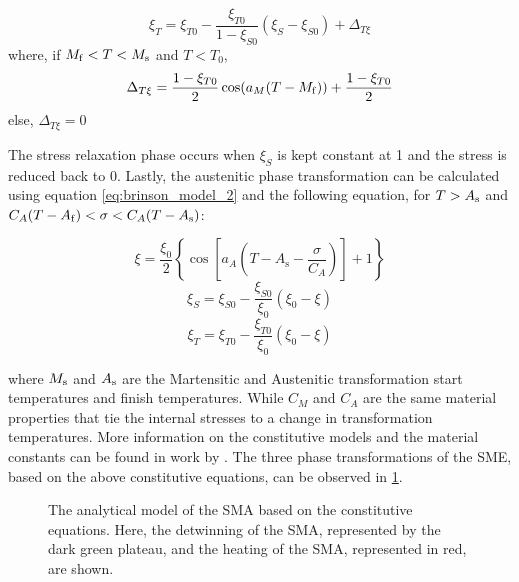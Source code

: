 \begin{equation}
  \label{eq:brinson_conv_xit2}
  \xi_T = \xi_{T0} - \frac{\xi_{T0}}{1-\xi_{S0}}(\xi_S-\xi_{S0})+\Delta_{T\xi}
\end{equation}
where, if $M_\mathrm{f}<T<M_\mathrm{s}$ and $T<T_0$,
\begin{equation}
  \label{eq:deltaTxi}
  \Delta_{T\xi} = \frac{1-\xi_{T0}}{2}\cos(a_M(T-M_\mathrm{f}))+\frac{1-\xi_{T0}}{2}
\end{equation}
else, $\Delta_{T\xi}=0$

The stress relaxation phase occurs when $\xi_S$ is kept constant at 1 and the stress is reduced back to 0. Lastly, the austenitic phase transformation can be calculated using equation \ref{eq:brinson_model_2} and the following equation, for $T>A_\mathrm{s}$ and $C_A(T-A_\mathrm{f})<\sigma<C_A(T-A_\mathrm{s})$:

\begin{equation}
  \label{eq:A_transf}
  \xi = \frac{\xi_0}{2}\left\{\cos\left[a_A\left(T-A_\mathrm{s}-\frac{\sigma}{C_A}\right)\right]+1\right\}
\end{equation}
\begin{equation}
    \label{eq:a-transf_1}
    \xi_S = \xi_{S0} - \frac{\xi_{S0}}{\xi_0}(\xi_0-\xi)
\end{equation}
\begin{equation}
    \label{eq:a-transf_2}
    \xi_T = \xi_{T0} - \frac{\xi_{T0}}{\xi_0}(\xi_0-\xi)
\end{equation}

where $M_\mathrm{s}$ and $A_\mathrm{s}$ are the Martensitic and Austenitic transformation start temperatures and finish temperatures. While $C_M$ and $C_A$ are the same material properties that tie the internal stresses to a change in transformation temperatures. More information on the constitutive models and the material constants can be found in work by \cite{brinsonOneDimensionalConstitutiveBehavior1993}. The three phase transformations of the SME, based on the above constitutive equations, can be observed in \cref{fig:brinson-model-stress-strain}.
\begin{figure}[hbt]
    \centering
    \resizebox{0.75\textwidth}{!}{}
    \caption{The analytical model of the SMA based on the \cite{brinsonOneDimensionalConstitutiveBehavior1993} constitutive equations. Here, the detwinning of the SMA, represented by the dark green plateau, and the heating of the SMA, represented in red, are shown.}
    \label{fig:brinson-model-stress-strain}
\end{figure}

